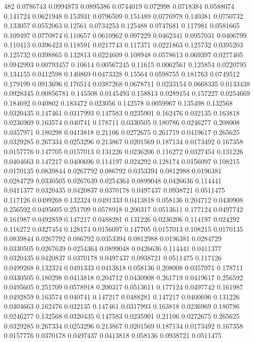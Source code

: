 482
0.0786743 0.0994873
0.0895386 0.0744019
0.072998 0.0718384
0.0588074 0.141724
0.0621948 0.153931
0.0796509 0.151489
0.0776978 0.140381
0.0750732 0.133057
0.0552063 0.12561
0.0734253 0.125488
0.0747681 0.117981
0.0581665 0.109497
0.0770874 0.110657
0.0610962 0.097229
0.0462341 0.0957031
0.0406799 0.110413
0.0396423 0.118591
0.0217743 0.117371
0.0221863 0.125732
0.0395203 0.125732
0.0398865 0.132813
0.0224609 0.108948
0.0578613 0.069397
0.0277405 0.0942993
0.00793457 0.10614
0.00567245 0.11615
0.0062561 0.125854
0.0220795 0.134155
0.0412598 0.140869
0.0473328 0.15564
0.0598755 0.181763
0.0749512 0.179199
0.0913696 0.176514
0.0387268 0.0678711
0.0233154 0.0668335
0.0133438 0.0928345
0.00856781 0.145508
0.0145493 0.158813
0.0289154 0.157227
0.0254669 0.184692
0.040802 0.183472
0.023056 0.142578
0.0059967 0.135498
0.132568 0.0320435
0.147461 0.0317993
0.147583 0.0235901
0.162476 0.032135
0.163818 0.0236969
0.163574 0.040741
0.178711 0.0330505
0.180786 0.0246277
0.208008 0.0357971
0.180298 0.0413818
0.21106 0.0272675
0.261719 0.0419617
0.265625 0.0329285
0.267334 0.0253296
0.213867 0.0201569
0.187134 0.0173492
0.167358 0.0157776
0.147705 0.0157013
0.131226 0.0236206
0.116272 0.0327454
0.131226 0.0404663
0.147217 0.0400696
0.114197 0.024292
0.128174 0.0156097
0.108215 0.0170135
0.0839844 0.0267792
0.086792 0.0353394
0.0812988 0.0196381
0.0284729 0.0330505
0.0267639 0.0254364
0.0899048 0.0426636
0.114441 0.0411377
0.0320435 0.0420837
0.0370178 0.0497437
0.0938721 0.0511475
0.117126 0.0499268
0.132324 0.0491333
0.0413818 0.058136
0.204712 0.0430908
0.256592 0.0495605
0.251709 0.0578918
0.200317 0.0513611
0.177124 0.0497742
0.161987 0.0492859
0.147217 0.0488281
0.131226 0.0236206
0.114197 0.024292
0.116272 0.0327454
0.128174 0.0156097
0.147705 0.0157013
0.108215 0.0170135
0.0839844 0.0267792
0.086792 0.0353394
0.0812988 0.0196381
0.0284729 0.0330505
0.0267639 0.0254364
0.0899048 0.0426636
0.114441 0.0411377
0.0320435 0.0420837
0.0370178 0.0497437
0.0938721 0.0511475
0.117126 0.0499268
0.132324 0.0491333
0.0413818 0.058136
0.208008 0.0357971
0.178711 0.0330505
0.180298 0.0413818
0.204712 0.0430908
0.261719 0.0419617
0.256592 0.0495605
0.251709 0.0578918
0.200317 0.0513611
0.177124 0.0497742
0.161987 0.0492859
0.163574 0.040741
0.147217 0.0488281
0.147217 0.0400696
0.131226 0.0404663
0.162476 0.032135
0.147461 0.0317993
0.163818 0.0236969
0.180786 0.0246277
0.132568 0.0320435
0.147583 0.0235901
0.21106 0.0272675
0.265625 0.0329285
0.267334 0.0253296
0.213867 0.0201569
0.187134 0.0173492
0.167358 0.0157776
0.0370178 0.0497437
0.0413818 0.058136
0.0938721 0.0511475
